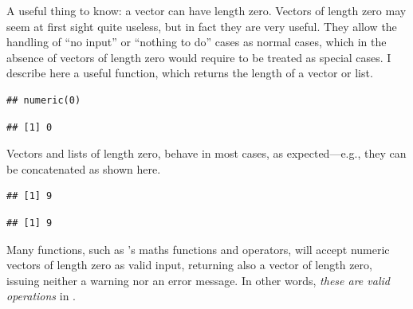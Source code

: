 \documentclass[krantz2]{krantz}\usepackage{knitr}
\begin{document}
\begin{explainbox}
A useful thing to know: a vector can have length zero. Vectors of length zero may seem at first sight quite useless, but in fact they are very useful. They allow the handling of ``no input'' or ``nothing to do'' cases as normal cases, which in the absence of vectors of length zero would require to be treated as special cases. I describe here a useful function,  which returns the length of a vector or list.

\begin{knitrout}\footnotesize
{}\color{fgcolor}\begin{kframe}
\begin{alltt}
 \hlkwb{<-} \hlstd{(}\hlstd{)}
\end{alltt}
\begin{verbatim}
## numeric(0)
\end{verbatim}
\begin{alltt}
\end{alltt}
\begin{verbatim}
## [1] 0
\end{verbatim}
\end{kframe}
\end{knitrout}

Vectors and lists of length zero, behave in most cases, as expected---e.g.,  they can be concatenated as shown here.

\begin{knitrout}\footnotesize
{}\color{fgcolor}\begin{kframe}
\begin{alltt}
\hlstd{(} \hlstd{(}
\end{alltt}
\begin{verbatim}
## [1] 9
\end{verbatim}
\begin{alltt}
\hlstd{(}
\end{alltt}
\begin{verbatim}
## [1] 9
\end{verbatim}
\end{kframe}
\end{knitrout}

Many functions, such as \Rlang's maths functions and operators, will accept numeric vectors of length zero as valid input, returning also a vector of length zero, issuing neither a warning nor an error message. In other words, \emph{these are valid operations} in \Rlang.


\end{explainbox}
\end{document}

